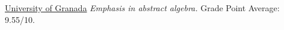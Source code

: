 \documentclass[nocolors]{friggeri-cv-a4}
\begin{document}
\begin{entrylist}
  
{\href{http://www.ugr.es/en/}{University of Granada}}
{\emph{Emphasis in abstract algebra.} Grade Point Average: 9.55/10.
  { 
  }
}


\end{entrylist}
\end{document}
